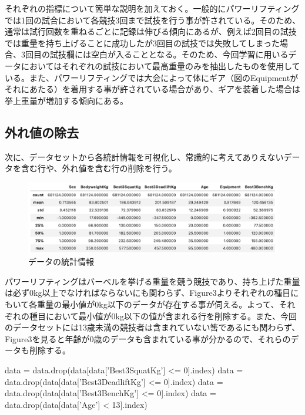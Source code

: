 \documentclass{report}
\begin{document}
それぞれの指標について簡単な説明を加えておく。一般的にパワーリフティングでは1回の試合において各競技3回まで試技を行う事が許されている。そのため、通常は試行回数を重ねるごとに記録は伸びる傾向にあるが、例えば2回目の試技では重量を持ち上げることに成功したが3回目の試技では失敗してしまった場合、3回目の試技欄には空白が入ることとなる。そのため、今回学習に用いるデータにおいてはそれぞれの試技において最高重量のみを抽出したものを使用している。また、パワーリフティングでは大会によって体にギア（図のEquipmentがそれにあたる）を着用する事が許されている場合があり、ギアを装着した場合は挙上重量が増加する傾向にある。

\subsection{外れ値の除去}

次に、データセットから各統計情報を可視化し、常識的に考えてありえないデータを含む行や、外れ値を含む行の削除を行う。
\\

\begin{figure}[H]
\begin{center}
\includegraphics[width=\linewidth]{data_stats.png}
\caption{データの統計情報}
\end{center}
\end{figure}

パワーリフティングはバーベルを挙げる重量を競う競技であり、持ち上げた重量は必ず0kg以上でなければならないにも関わらず、Figure3よりそれぞれの種目にもいて各重量の最小値が0kg以下のデータが存在する事が伺える。よって、それぞれの種目において最小値が0kg以下の値が含まれる行を削除する。また、今回のデータセットには13歳未満の競技者は含まれていない筈であるにも関わらず、Figure3を見ると年齢が0歳のデータも含まれている事が分かるので、それらのデータも削除する。


\begin{python}[caption=0kg以下の重量、13歳未満の年齢を含む行の削除]
data = data.drop(data[data['Best3SquatKg'] <= 0].index)
data = data.drop(data[data['Best3DeadliftKg'] <= 0].index)
data = data.drop(data[data['Best3BenchKg'] <= 0].index)
data = data.drop(data[data['Age'] < 13].index)
\end{python}
\end{document}
